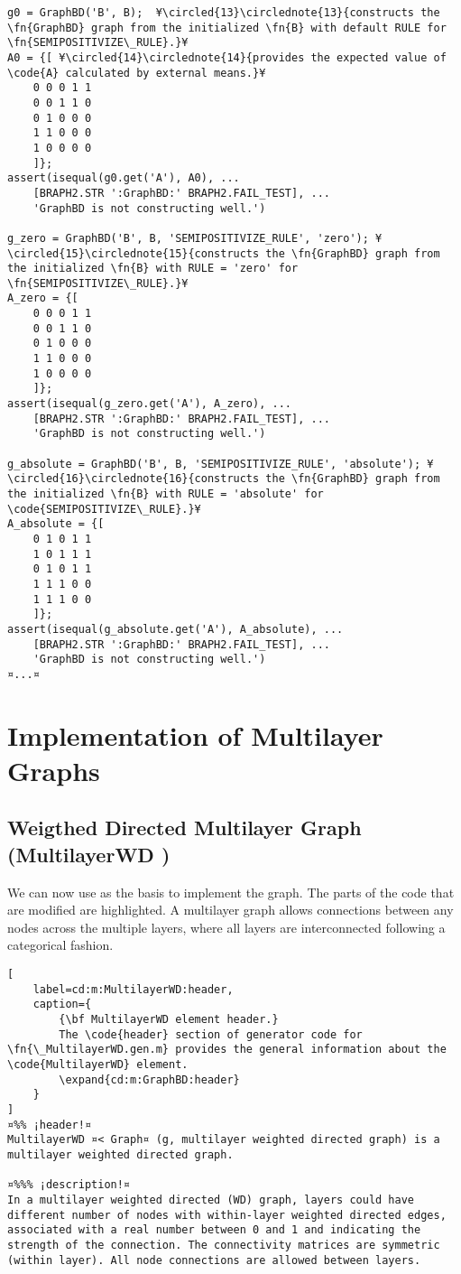 \documentclass{tufte-handout}
\begin{document}
\begin{lstlisting}
g0 = GraphBD('B', B);  ¥\circled{13}\circlednote{13}{constructs the \fn{GraphBD} graph from the initialized \fn{B} with default RULE for \fn{SEMIPOSITIVIZE\_RULE}.}¥
A0 = {[ ¥\circled{14}\circlednote{14}{provides the expected value of \code{A} calculated by external means.}¥
	0 0 0 1 1
	0 0 1 1 0
	0 1 0 0 0
	1 1 0 0 0
	1 0 0 0 0
	]};
assert(isequal(g0.get('A'), A0), ... 
	[BRAPH2.STR ':GraphBD:' BRAPH2.FAIL_TEST], ...
	'GraphBD is not constructing well.')

g_zero = GraphBD('B', B, 'SEMIPOSITIVIZE_RULE', 'zero'); ¥\circled{15}\circlednote{15}{constructs the \fn{GraphBD} graph from the initialized \fn{B} with RULE = 'zero' for \fn{SEMIPOSITIVIZE\_RULE}.}¥
A_zero = {[
	0 0 0 1 1
	0 0 1 1 0
	0 1 0 0 0
	1 1 0 0 0
	1 0 0 0 0
	]};
assert(isequal(g_zero.get('A'), A_zero), ...
	[BRAPH2.STR ':GraphBD:' BRAPH2.FAIL_TEST], ...
	'GraphBD is not constructing well.')

g_absolute = GraphBD('B', B, 'SEMIPOSITIVIZE_RULE', 'absolute'); ¥\circled{16}\circlednote{16}{constructs the \fn{GraphBD} graph from the initialized \fn{B} with RULE = 'absolute' for \code{SEMIPOSITIVIZE\_RULE}.}¥
A_absolute = {[
	0 1 0 1 1
	1 0 1 1 1
	0 1 0 1 1
	1 1 1 0 0
	1 1 1 0 0
	]};
assert(isequal(g_absolute.get('A'), A_absolute), ...
	[BRAPH2.STR ':GraphBD:' BRAPH2.FAIL_TEST], ...
	'GraphBD is not constructing well.')
¤...¤
\end{lstlisting}

\clearpage
\section{Implementation of Multilayer Graphs}

\subsection{Weigthed Directed Multilayer Graph (MultilayerWD )}

We can now use  as the basis to implement the  graph. The parts of the code that are modified are highlighted.
A multilayer graph allows connections between any nodes across the multiple layers, where all layers are interconnected following a categorical fashion.

\begin{lstlisting}[
	label=cd:m:MultilayerWD:header,
	caption={
		{\bf MultilayerWD element header.}
		The \code{header} section of generator code for \fn{\_MultilayerWD.gen.m} provides the general information about the \code{MultilayerWD} element.
		\expand{cd:m:GraphBD:header}
	}
]
¤%% ¡header!¤
MultilayerWD ¤< Graph¤ (g, multilayer weighted directed graph) is a multilayer weighted directed graph.

¤%%% ¡description!¤
In a multilayer weighted directed (WD) graph, layers could have different number of nodes with within-layer weighted directed edges, associated with a real number between 0 and 1 and indicating the strength of the connection. The connectivity matrices are symmetric (within layer). All node connections are allowed between layers.
\end{lstlisting}
\end{document}
